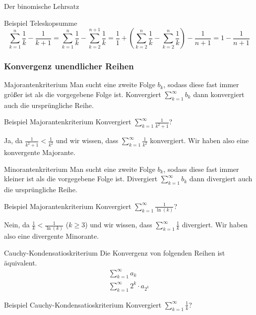 \documentclass[german]{spicker}
\begin{document}
\begin{defi}{Der binomische Lehrsatz}
\begin{bonus}{Beispiel Teleskopsumme}
    \[
        \sum_{k=1}^n \frac{1}{k} - \frac{1}{k+1} = \sum_{k=1}^n \frac{1}{k} - \sum_{k=2}^{n+1} \frac{1}{k} = \frac{1}{1} +\left( \sum_{k=2}^n \frac{1}{k} - \sum_{k=2}^n \frac{1}{k} \right) - \frac{1}{n+1} = 1-\frac{1}{n+1}
    \]
\end{bonus}
\subsubsection{Konvergenz unendlicher Reihen}
\begin{algo}{Majorantenkriterium}
    Man sucht eine zweite Folge $b_k$, sodass diese fast immer größer ist als die vorgegebene Folge ist.
    Konvergiert $\sum_{k=1}^{\infty} b_k$ dann konvergiert auch die ursprüngliche Reihe.
\end{algo}
\begin{bonus}{Beispiel Majorantenkriterium}
    Konvergiert $\sum_{k=1}^{\infty} \frac{1}{k^2+1}$?

    Ja, da $\frac{1}{k^2+1} < \frac{1}{k^2}$ und wir wissen, dass $\sum_{k=1}^{\infty} \frac{1}{k^2}$ konvergiert.
    Wir haben also eine konvergente Majorante.
\end{bonus}
\begin{algo}{Minorantenkriterium}
    Man sucht eine zweite Folge $b_k$, sodass diese fast immer kleiner ist als die vorgegebene Folge ist.
    Divergiert $\sum_{k=1}^{\infty} b_k$ dann divergiert auch die ursprüngliche Reihe.
\end{algo}
\begin{bonus}{Beispiel Majorantenkriterium}
    Konvergiert $\sum_{k=1}^{\infty} \frac{1}{\ln(k)}$?

    Nein, da $\frac{1}{k} < \frac{1}{\ln(k)}$ ($k\geq3$) und wir wissen, dass $\sum_{k=1}^{\infty} \frac{1}{k}$ divergiert.
    Wir haben also eine divergente Minorante.
\end{bonus}
\begin{algo}{Cauchy-Kondensatioskriterium}
    Die Konvergenz von folgenden Reihen ist äquivalent.
    \begin{align}
        \sum_{k=1}^{\infty} a_k \\
        \sum_{k=1}^{\infty} 2^k \cdot a_{2^k}
    \end{align}
\end{algo}
\begin{bonus}{Beispiel Cauchy-Kondensatioskriterium}
    Konvergiert $\sum_{k=1}^{\infty} \frac{1}{k}$?


\end{bonus}
\end{defi}
\end{document}
